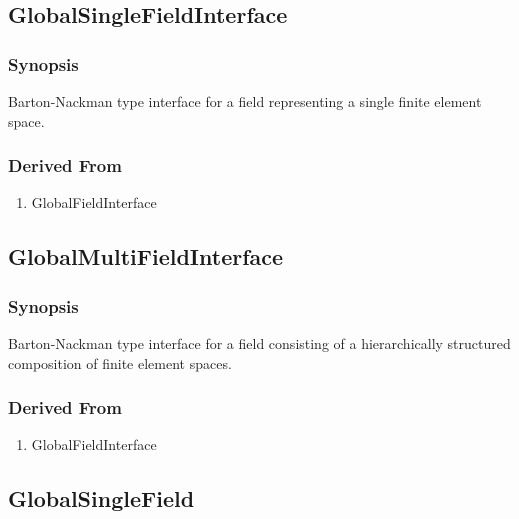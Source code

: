 \documentclass[11pt,a4paper,DIV11,%
notitlepage,oneside,abstracton,%
bibtotoc]{scrartcl}
\begin{document}
\subsection{GlobalSingleFieldInterface}

\subsubsection{Synopsis}

Barton-Nackman type interface for a field representing a single finite
element space. 

\subsubsection{Derived From}

\begin{enumerate}[1)]
\item GlobalFieldInterface
\end{enumerate}

\subsection{GlobalMultiFieldInterface}

\subsubsection{Synopsis}

Barton-Nackman type interface for a field consisting of 
a hierarchically structured composition of finite element spaces.

\subsubsection{Derived From}

\begin{enumerate}[1)]
\item GlobalFieldInterface
\end{enumerate}

\subsection{GlobalSingleField}
\end{document}
